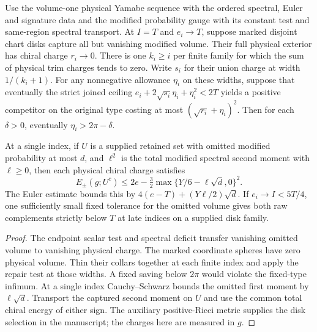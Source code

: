 \begin{proposition}
\label{prop:ed03-same-width}
\leanok
Use the volume-one physical Yamabe sequence with the ordered spectral,
Euler and signature data and the modified probability gauge with its
constant test and same-region spectral transport. At $I=T$ and
$e_i\to T$, suppose marked disjoint chart disks capture all but vanishing
modified volume. Their full physical exterior has chiral charge $r_i\to0$.
There is one $k_i\ge i$ per finite family for which the sum of physical
trim charges tends to zero. Write $s_i$ for their union charge at width
$1/(k_i+1)$. For any nonnegative allowance $\eta_i$ on these widths,
suppose that eventually the strict joined ceiling
$e_i+2\sqrt{s_i}\eta_i+\eta_i^2<2T$ yields a positive competitor on
the original type costing at most $(\sqrt{r_i}+\eta_i)^2$. Then for each
$\delta>0$, eventually $\eta_i>2\pi-\delta$.

At a single index, if $U$ is a supplied retained set with omitted modified
probability at most $d$, and $\ell^2$ is the total modified spectral second
moment with $\ell\ge0$, then each physical chiral charge satisfies
\[
 E_\pm(g;U^c)\le 2e-\tfrac32\max\{Y/6-\ell\sqrt d,0\}^2 .
\]
The Euler estimate bounds this by $4(e-T)+(Y\ell/2)\sqrt d$.
If $e_i\to I<5T/4$, one sufficiently small fixed tolerance for the
omitted volume gives both raw complements strictly below $T$ at late
indices on a supplied disk family.
\end{proposition}
\begin{proof}
\leanok
The endpoint scalar test and spectral deficit transfer vanishing omitted
volume to vanishing physical charge. The marked coordinate spheres have
zero physical volume. Thin their collars together at each finite index
and apply the repair test at those widths. A fixed saving below $2\pi$
would violate the fixed-type infimum. At a single index Cauchy--Schwarz
bounds the omitted first moment by $\ell\sqrt d$. Transport the captured
second moment on $U$ and use the common total chiral energy of either
sign. The auxiliary positive-Ricci metric supplies the disk selection in
the manuscript; the charges here are measured in $g$.
\end{proof}

